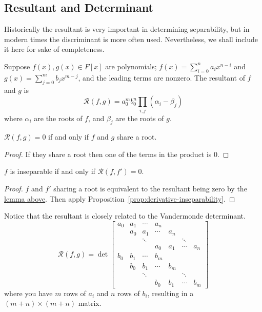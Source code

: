 \subsection*{Resultant and Determinant}

\begin{remark}
    Historically the resultant is very important in determining separability,
    but in modern times the discriminant is more often used.
    Nevertheless, we shall include it here for sake of completeness.
\end{remark}
\begin{definition}
    Suppose \(f(x),g(x) \in F[x]\) are polynomials;
    \(f(x) = \sum_{i=0}^n a_i x^{n-i}\) and \(g(x) = \sum_{j=0}^m b_j x^{m-j}\),
    and the leading terms are nonzero.
    The resultant of \(f\) and \(g\) is
    \begin{equation*}
        \mathcal{R}(f,g) = a_0^m b_0^n \prod_{i,j} (\alpha_i - \beta_j)
    \end{equation*}
    where \(\alpha_i\) are the roots of \(f\),
    and \(\beta_j\) are the roots of \(g\).
\end{definition}
\begin{lemma}\label{lem:resultant-zero}
    \(\mathcal{R}(f,g) = 0\) if and only if \(f\) and \(g\) share a root.
\end{lemma}
\begin{proof}
    If they share a root then one of the terms in the product is 0.
\end{proof}
\begin{corollary}
    \(f\) is inseparable if and only if \(\mathcal{R}(f,f') = 0\).
\end{corollary}
\begin{proof}
    \(f\) and \(f'\) sharing a root is equivalent to
    the resultant being zero by the \hyperref[lem:resultant-zero]{lemma above}.
    Then apply Proposition~\ref{prop:derivative-inseparability}.
\end{proof}
\begin{remark}
    Notice that the resultant is closely related to the Vandermonde determinant.
    \begin{equation*}
        \mathcal{R}(f,g) = \det
        \begin{bmatrix}
            a_0 & a_1 & \cdots & a_n \\
            & a_0 & a_1 & \cdots & a_n \\
            & & \ddots & & & \ddots \\
            & & & a_0 & a_1 & \cdots & a_n \\
            b_0 & b_1 & \cdots & b_m \\
            & b_0 & b_1 & \cdots & b_m \\
            & & \ddots & & & \ddots \\
            & & & b_0 & b_1 & \cdots & b_m
        \end{bmatrix}
    \end{equation*}
    where you have \(m\) rows of \(a_i\) and \(n\) rows of \(b_i\),
    resulting in a \((m+n)\times(m+n)\) matrix.
\end{remark}

